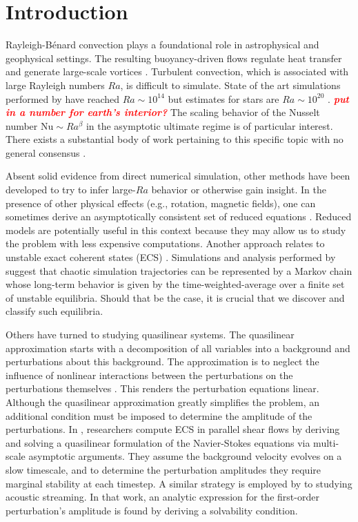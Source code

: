 \documentclass[reprint,amsmath,amssymb,aps]{revtex4-1}
\newcommand{\note}[1]{\noindent \textbf{\textit{\textcolor{Red}{#1}}}}
\newcommand\Nu{\mathrm{Nu}}
\begin{document}
\section{Introduction}
Rayleigh-B\'enard convection plays a foundational role in astrophysical and geophysical settings.
The resulting buoyancy-driven flows regulate heat transfer and generate large-scale vortices \cite{Couston}.
Turbulent convection, which is associated with large Rayleigh numbers $Ra$, is difficult to simulate. 
State of the art simulations performed by \cite{Zhu_2018} have reached $Ra \sim 10^{14}$ but estimates for stars are $Ra \sim 10^{20}$ \cite{Ossendrijver}. 
\note{put in a number for earth's interior?}
The scaling behavior of the Nusselt number $\Nu \sim Ra^{\beta}$ in the asymptotic ultimate regime is of particular interest.
There exists a substantial body of work pertaining to this specific topic with no general consensus \cite{Malkus_1954, Howard_1966, Kraichnan, Spiegel, Castaing, Grossman, Ahlers}. 

Absent solid evidence from direct numerical simulation, other methods have been developed to try to infer large-$Ra$ behavior or otherwise gain insight.
In the presence of other physical effects (e.g., rotation, magnetic fields), one can sometimes derive an asymptotically consistent set of reduced equations \cite{Julien2007, Julien2012}.
Reduced models are potentially useful in this context because they may allow us to study the problem with less expensive computations.
Another approach relates to unstable exact coherent states (ECS) \cite{Waleffe, Sondak, Wen, chini_cells}. 
Simulations and analysis performed by \cite{Yalniz, Cvitanovic} suggest that chaotic simulation trajectories can be represented by a Markov chain whose long-term behavior is given by the time-weighted-average over a finite set of unstable equilibria.
Should that be the case, it is crucial that we discover and classify such equilibria.

Others have turned to studying quasilinear systems.
The quasilinear approximation starts with a decomposition of all variables into a background and perturbations about this background.
The approximation is to neglect the influence of nonlinear interactions between the perturbations on the perturbations themselves \cite{marston2016}.
This renders the perturbation equations linear.
Although the quasilinear approximation greatly simplifies the problem, an additional condition must be imposed to determine the amplitude of the perturbations.
In \cite{Beaume_2015}, researchers compute ECS in parallel shear flows by deriving and solving a quasilinear formulation of the Navier-Stokes equations via multi-scale asymptotic arguments. 
They assume the background velocity evolves on a slow timescale, and to determine the perturbation amplitudes they require marginal stability at each timestep.
A similar strategy is employed by \cite{michel_chini_2019} to studying acoustic streaming.
In that work, an analytic expression for the first-order perturbation's amplitude is found by deriving a solvability condition.
\end{document}
